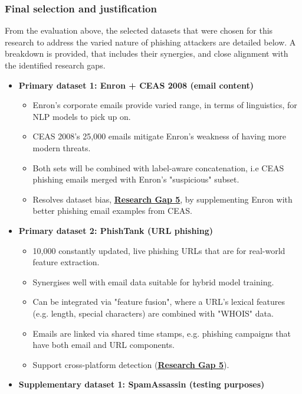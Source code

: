 
\subsubsection*{Final selection and justification}
From the evaluation above, the selected datasets that were chosen for this research to address the varied nature of phishing attackers are detailed below. A breakdown is provided, that includes their synergies, and close alignment with the identified research gaps.

\begin{itemize}
  \item \textbf{Primary dataset 1: Enron + CEAS 2008 (email content)}
  \begin{itemize}
    \item Enron's corporate emails provide varied range, in terms of linguistics, for NLP models to pick up on.
    \item CEAS 2008's 25,000 emails mitigate Enron's weakness of having more modern threats.
    \item Both sets will be combined with label-aware concatenation, i.e CEAS phishing emails merged with Enron's "suspicious" subset.
    \item Resolves dataset bias, \hyperref[research-gap-5]{\uline{\textbf{Research Gap 5}}}, by supplementing Enron with better phishing email examples from CEAS.
  \end{itemize}
  \item \textbf{Primary dataset 2: PhishTank (URL phishing)}
  \begin{itemize}
    \item 10,000 constantly updated, live phishing URLs that are for real-world feature extraction.
    \item Synergises well with email data suitable for hybrid model training.
    \item Can be integrated via "feature fusion", where a URL's lexical features (e.g. length, special characters) are combined with "WHOIS" data.
    \item Emails are linked via shared time stamps, e.g. phishing campaigns that have both email and URL components.
    \item Support cross-platform detection (\hyperref[research-gap-5]{\uline{\textbf{Research Gap 5}}}).
  \end{itemize}
  \item \textbf{Supplementary dataset 1: SpamAssassin (testing purposes)}

\end{itemize}
